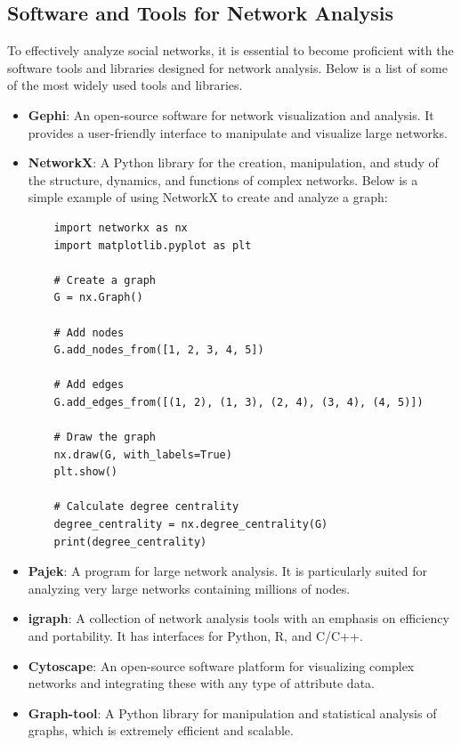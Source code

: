 \documentclass[12pt]{book} %
\begin{document}
\subsection{Software and Tools for Network Analysis}
To effectively analyze social networks, it is essential to become proficient with the software tools and libraries designed for network analysis. Below is a list of some of the most widely used tools and libraries.

\begin{itemize}
    \item \textbf{Gephi}: An open-source software for network visualization and analysis. It provides a user-friendly interface to manipulate and visualize large networks.
    \item \textbf{NetworkX}: A Python library for the creation, manipulation, and study of the structure, dynamics, and functions of complex networks. Below is a simple example of using NetworkX to create and analyze a graph:
    
    \begin{lstlisting}
    import networkx as nx
    import matplotlib.pyplot as plt
    
    # Create a graph
    G = nx.Graph()
    
    # Add nodes
    G.add_nodes_from([1, 2, 3, 4, 5])
    
    # Add edges
    G.add_edges_from([(1, 2), (1, 3), (2, 4), (3, 4), (4, 5)])
    
    # Draw the graph
    nx.draw(G, with_labels=True)
    plt.show()
    
    # Calculate degree centrality
    degree_centrality = nx.degree_centrality(G)
    print(degree_centrality)
    \end{lstlisting}
    
    \item \textbf{Pajek}: A program for large network analysis. It is particularly suited for analyzing very large networks containing millions of nodes.
    \item \textbf{igraph}: A collection of network analysis tools with an emphasis on efficiency and portability. It has interfaces for Python, R, and C/C++.
    \item \textbf{Cytoscape}: An open-source software platform for visualizing complex networks and integrating these with any type of attribute data.
    \item \textbf{Graph-tool}: A Python library for manipulation and statistical analysis of graphs, which is extremely efficient and scalable.
\end{itemize}
\end{document}
